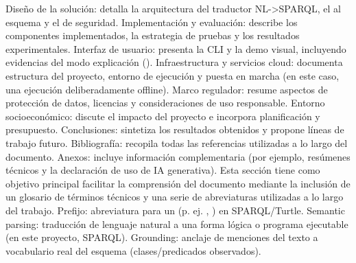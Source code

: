\markdownRendererUlItem Diseño de la solución: detalla la arquitectura del traductor NL->SPARQL, el  al esquema y el  de seguridad.\markdownRendererUlItemEnd 
\markdownRendererUlItem Implementación y evaluación: describe los componentes implementados, la estrategia de pruebas y los resultados experimentales.\markdownRendererUlItemEnd 
\markdownRendererUlItem Interfaz de usuario: presenta la CLI y la demo visual, incluyendo evidencias del modo explicación ().\markdownRendererUlItemEnd 
\markdownRendererUlItem Infraestructura y servicios cloud: documenta estructura del proyecto, entorno de ejecución y puesta en marcha (en este caso, una ejecución deliberadamente offline).\markdownRendererUlItemEnd 
\markdownRendererUlItem Marco regulador: resume aspectos de protección de datos, licencias y consideraciones de uso responsable.\markdownRendererUlItemEnd 
\markdownRendererUlItem Entorno socioeconómico: discute el impacto del proyecto e incorpora planificación y presupuesto.\markdownRendererUlItemEnd 
\markdownRendererUlItem Conclusiones: sintetiza los resultados obtenidos y propone líneas de trabajo futuro.\markdownRendererUlItemEnd 
\markdownRendererUlItem Bibliografía: recopila todas las referencias utilizadas a lo largo del documento.\markdownRendererUlItemEnd 
\markdownRendererUlItem Anexos: incluye información complementaria (por ejemplo, resúmenes técnicos y la declaración de uso de IA generativa).\markdownRendererUlItemEnd 
\markdownRendererUlEndTight \markdownRendererInterblockSeparator
{}\markdownRendererInterblockSeparator
{}Esta sección tiene como objetivo principal facilitar la comprensión del documento mediante la inclusión de un glosario de términos técnicos y una serie de abreviaturas utilizadas a lo largo del trabajo.\markdownRendererInterblockSeparator
{}\markdownRendererInterblockSeparator
{}\markdownRendererUlBeginTight
\markdownRendererUlItem Prefijo: abreviatura para un  (p. ej. , ) en SPARQL/Turtle.\markdownRendererUlItemEnd 
\markdownRendererUlItem Semantic parsing: traducción de lenguaje natural a una forma lógica o programa ejecutable (en este proyecto, SPARQL).\markdownRendererUlItemEnd 
\markdownRendererUlItem Grounding: anclaje de menciones del texto a vocabulario real del esquema (clases/predicados observados).\markdownRendererUlItemEnd 

